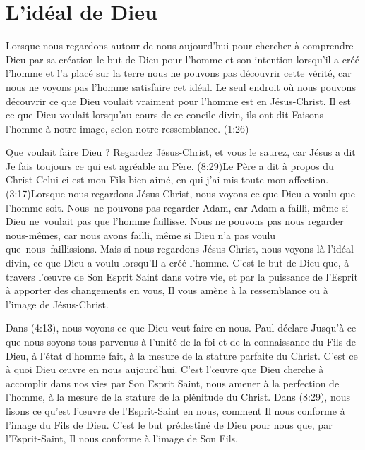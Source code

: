 \section{L'id\'eal de Dieu}

Lorsque nous regardons autour de nous aujourd'hui pour
 chercher à comprendre Dieu par sa création
 \ocadr le but de Dieu pour l'homme et son intention
 lorsqu'il a créé l'homme et l'a placé sur la terre \fcadr{}
 nous ne pouvons pas découvrir cette vérité,
 car nous ne voyons pas l'homme satisfaire cet idéal.
 Le seul endroit où nous pouvons découvrir ce que Dieu voulait vraiment
 pour l'homme est en Jésus-Christ.
 Il est ce que Dieu voulait lorsqu'au cours de ce concile divin, ils ont dit\frcolon{}
 \Og Faisons l'homme à notre image, selon notre ressemblance. \Fg{}
 (1:26)

Que voulait faire Dieu ?
 Regardez Jésus-Christ, et vous le saurez, car Jésus a dit\frcolon{}
 \Og Je fais toujours ce qui est agréable au Père. \Fg{}
 (8:29)Le Père a dit à propos du Christ\frcolon{}
 \Og Celui-ci est mon Fils bien-aimé, en qui j'ai mis toute mon affection. \Fg{}
 (3:17)Lorsque nous regardons Jésus-Christ,
 nous voyons ce que Dieu a voulu que l'homme soit.
 Nous~ne pouvons pas regarder Adam, car Adam a failli,
 même si Dieu ne~voulait pas que l'homme faillisse.
 Nous ne pouvons pas nous regarder nous-mêmes,
 car nous avons failli, même si Dieu n'a pas voulu que~nous~faillissions.
 Mais si nous regardons Jésus-Christ, nous voyons là l'idéal divin,
 ce que Dieu a voulu lorsqu'Il a créé l'homme.
 C'est le but de Dieu que, à travers l'œuvre de Son Esprit Saint dans votre vie,
 et par la puissance de l'Esprit à apporter des changements en vous,
 Il vous amène à la ressemblance ou à l'image de Jésus-Christ.

Dans (4:13), nous voyons ce que Dieu veut faire en nous.
 Paul déclare\frcolon{}
 \Og Jusqu'à ce que nous soyons tous parvenus à l'unité de la foi
 et de la connaissance du Fils de Dieu, à l'état d'homme fait,
 à la mesure de la stature parfaite du Christ. \Fg{}
 C'est ce à quoi Dieu œuvre en nous aujourd'hui.
 C'est l'œuvre que Dieu cherche à accomplir dans nos vies
 par Son Esprit Saint, nous amener à la perfection de l'homme,
 à la mesure de la stature de la plénitude du Christ.
 Dans (8:29), nous lisons
 ce qu'est l'œuvre de l'Esprit-Saint en nous,
 comment Il nous conforme à l'image du Fils de Dieu.
 C'est le but prédestiné de Dieu pour nous
 que, par l'Esprit-Saint, Il nous conforme à l'image de Son Fils.


